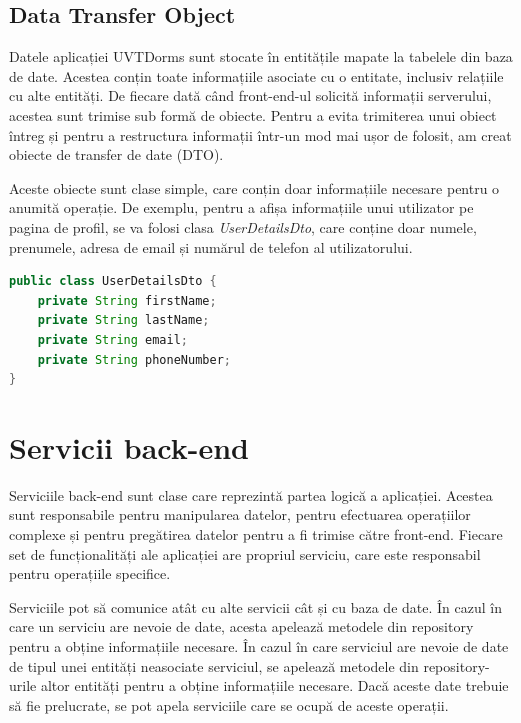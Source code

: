 \documentclass[12pt,a4paper]{report}
\theoremstyle{definition}
\theoremstyle{remark}
\begin{document}
\subsection{Data Transfer Object}

\par Datele aplicației UVTDorms sunt stocate în entitățile mapate la tabelele din baza de date. Acestea conțin toate informațiile asociate cu o entitate, inclusiv relațiile cu alte entități. De fiecare dată când front-end-ul solicită informații serverului, acestea sunt trimise sub formă de obiecte. Pentru a evita trimiterea unui obiect întreg și pentru a restructura informații într-un mod mai ușor de folosit, am creat obiecte de transfer de date (DTO)\cite{pantaleev2007identifying}.

\par Aceste obiecte sunt clase simple, care conțin doar informațiile necesare pentru o anumită operație. De exemplu, pentru a afișa informațiile unui utilizator pe pagina de profil, se va folosi clasa \textit{UserDetailsDto}, care conține doar numele, prenumele, adresa de email și numărul de telefon al utilizatorului.

\begin{lstlisting}[language=Java, caption={Clasa UserDetailsDto}]
public class UserDetailsDto {
    private String firstName;
    private String lastName;
    private String email;
    private String phoneNumber;
}
\end{lstlisting}

\section{Servicii back-end}
\par Serviciile back-end sunt clase care reprezintă partea logică a aplicației. Acestea sunt responsabile pentru manipularea datelor, pentru efectuarea operațiilor complexe și pentru pregătirea datelor pentru a fi trimise către front-end. Fiecare set de funcționalități ale aplicației are propriul serviciu, care este responsabil pentru operațiile specifice.

\par Serviciile pot să comunice atât cu alte servicii cât și cu baza de date. În cazul în care un serviciu are nevoie de date, acesta apelează metodele din repository pentru a obține informațiile necesare. În cazul în care serviciul are nevoie de date de tipul unei entități neasociate serviciul, se apelează metodele din repository-urile altor entități pentru a obține informațiile necesare. Dacă aceste date trebuie să fie prelucrate, se pot apela serviciile care se ocupă de aceste operații.
\end{document}
